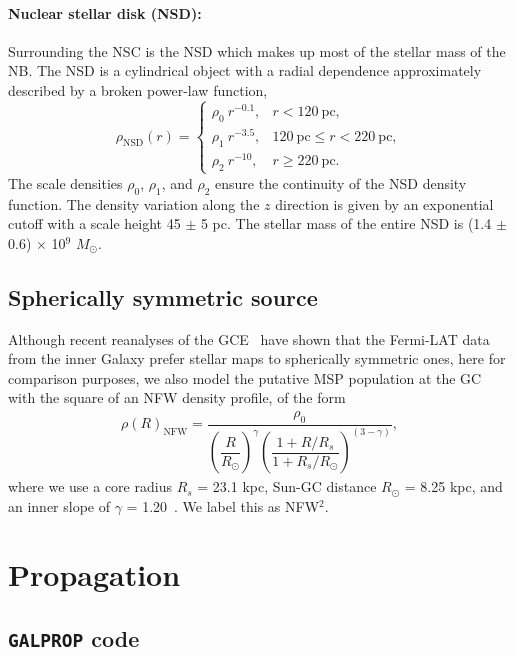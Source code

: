 \documentclass[%
reprint,
superscriptaddress,
amsmath,amssymb,
aps,
floatfix,
]{revtex4-1}
\begin{document}
\paragraph{Nuclear stellar disk (NSD):} Surrounding the NSC is the NSD which makes up most of the stellar mass of the NB. The NSD is a cylindrical object with a radial dependence approximately described by a broken power-law function,
\begin{equation}\label{eq:rhonsd}
  \rho_{\text{NSD}}(r) = \begin{cases}
    \rho_0\ r^{-0.1}, & r < 120\ \text{pc},\\
    \rho_1\ r^{-3.5}, & 120\ \text{pc} \leq r < 220\ \text{pc},\\
    \rho_2\ r^{-10}, & r \geq 220\ \text{pc}.
  \end{cases}
\end{equation}
The scale densities $\rho_0$, $\rho_1$, and $\rho_2$ ensure the continuity of the NSD density function. The density variation along the $z$ direction is given by an exponential cutoff with a scale height 45 $\pm$ 5 pc. The stellar mass of the entire NSD is (1.4 $\pm$ 0.6) $\times$ 10$^9$ $M_\odot$.

\subsection{Spherically symmetric source}\label{sec:NFW}

Although recent reanalyses of the GCE~\cite{Macias:2016nev,Bartels:2017vsx} have shown that the Fermi-LAT data from the inner Galaxy prefer stellar maps to spherically symmetric ones, here for comparison purposes, we also model the putative MSP population at the GC with the square of an NFW density profile, of the form
\begin{eqnarray}\label{eq:NFW}
  \rho(R)_{\text{NFW}} = \dfrac{\rho_0}{\left(\dfrac{R}{R_\odot}\right)^\gamma\left(\dfrac{1+R/R_s}{1+R_s/R_\odot}\right)^{(3-\gamma)}},
\end{eqnarray}
where we use a core radius $R_s$ = 23.1 kpc, Sun-GC distance $R_\odot$ = 8.25 kpc, and an inner slope of $\gamma$ = 1.20~\cite{Abazajian:2012pn,Macias:2013vya}. We label this as NFW$^2$.

\section{Propagation}\label{sec:prop}

\subsection{\texttt{GALPROP} code}\label{sec:galprop}
\end{document}
